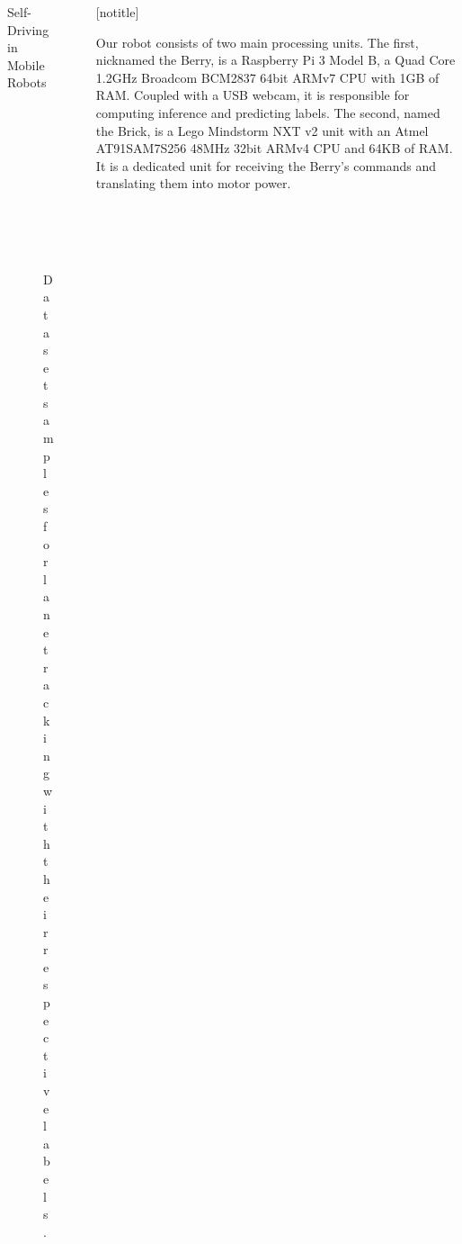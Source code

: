 \documentclass[final,hyperref={pdfpagelabels=false},notheorems]{beamer}
\newcommand{\shrink}{-15pt}
\theoremstyle{thesisstyle}
\begin{document}
\begin{frame}[t]
\begin{columns}[t]
\begin{column}{.5\textwidth}
\begin{block}{Self-Driving in Mobile Robots}
\begin{figure}
\begin{subfigure}{0.3\linewidth}
          \captionsetup{justification=centering}
          \caption*{UP}
        \end{subfigure}
        \begin{subfigure}{0.3\linewidth}
          \centering\includegraphics[width=1.0\textwidth]{imgs/sample_right.png}
          \captionsetup{justification=centering}
          \caption*{RIGHT}
        \end{subfigure}
        \caption{Dataset samples for lane tracking with their respective labels.}
      \end{figure}
    \end{block}

  \end{column}


  \begin{column}{.018\textwidth}\end{column} %

  \begin{column}{.5\textwidth}

    \vspace{\shrink}
    [notitle]
    \begin{block}{}
      Our robot consists of two main processing units. The first, nicknamed the Berry, is a
      Raspberry Pi 3 Model B, a Quad Core 1.2GHz Broadcom BCM2837 64bit ARMv7 CPU with 1GB of RAM.
      Coupled with a USB webcam, it is responsible for computing inference and predicting labels.
      The second, named the Brick, is a Lego Mindstorm NXT v2 unit with an Atmel AT91SAM7S256 48MHz
      32bit ARMv4 CPU and 64KB of RAM. It is a dedicated unit for receiving the Berry's commands and
      translating them into motor power.


\end{block}
\end{column}
\end{columns}
\end{frame}
\end{document}
